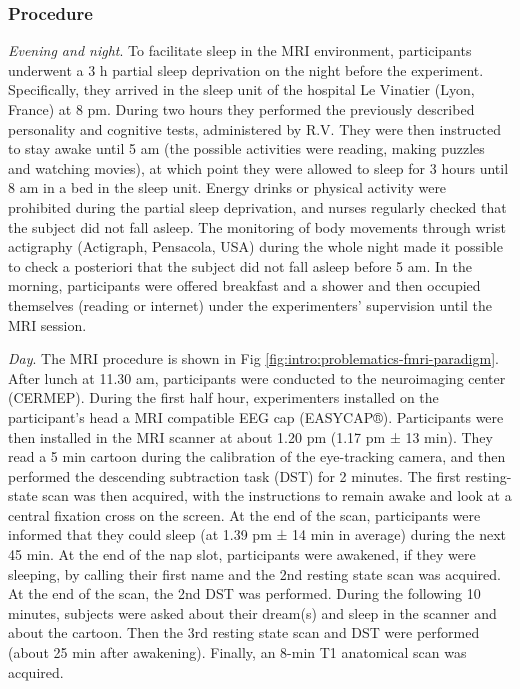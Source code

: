 \subsubsection*{Procedure}
\emph{Evening and night}. To facilitate sleep in the MRI environment, participants underwent a 3 h partial sleep deprivation on the night before the experiment. Specifically, they arrived in the sleep unit of the hospital Le Vinatier (Lyon, France) at 8 pm. During two hours they performed the previously described personality and cognitive tests, administered by R.V. They were then instructed to stay awake until 5 am (the possible activities were reading, making puzzles and watching movies), at which point they were allowed to sleep for 3 hours until 8 am in a bed in the sleep unit. Energy drinks or physical activity were prohibited during the partial sleep deprivation, and nurses regularly checked that the subject did not fall asleep. The monitoring of body movements through wrist actigraphy (Actigraph, Pensacola, USA) during the whole night made it possible to check a posteriori that the subject did not fall asleep before 5 am. In the morning, participants were offered breakfast and a shower and then occupied themselves (reading or internet) under the experimenters’ supervision until the MRI session.

\emph{Day}. The MRI procedure is shown in Fig \ref{fig:intro:problematics-fmri-paradigm}. After lunch at 11.30 am, participants were conducted to the neuroimaging center (CERMEP). During the first half hour, experimenters installed on the participant’s head a MRI compatible EEG cap (EASYCAP®). Participants were then installed in the MRI scanner at about 1.20 pm (1.17 pm ± 13 min). They read a 5 min cartoon during the calibration of the eye-tracking camera, and then performed the descending subtraction task (DST) for 2 minutes. The first resting-state scan was then acquired, with the instructions to remain awake and look at a central fixation cross on the screen. At the end of the scan, participants were informed that they could sleep (at 1.39 pm ± 14 min in average) during the next 45 min. At the end of the nap slot, participants were awakened, if they were sleeping, by calling their first name and the 2nd resting state scan was acquired. At the end of the scan, the 2nd DST was performed. During the following 10 minutes, subjects were asked about their dream(s) and sleep in the scanner and about the cartoon. Then the 3rd resting state scan and DST were performed (about 25 min after awakening). Finally, an 8-min T1 anatomical scan was acquired.

